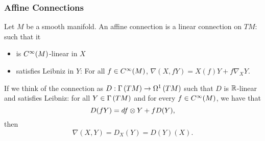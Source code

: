 \documentclass[main.tex]{subfiles}
\begin{document}
\subsubsection{Affine Connections}

Let $M$ be a smooth manifold. An affine connection is a linear connection on $TM$:
 such that it
\begin{itemize}
  \item is $C^\infty(M)$-linear in $X$
  \item satisfies Leibniz in $Y$: For all $f \in C^\infty(M)$, $\nabla(X, fY) = X(f)Y + f \nabla_X Y$.
\end{itemize}

\begin{note}
  If we think of the connection as $D: \Gamma\left( TM \right) \to \Omega^{1}\left( TM \right)$ such that $D$ is $\mathbb{R}$-linear and satisfies Leibniz: for all $Y \in \Gamma\left( TM \right)$ and for every $f \in C^\infty(M)$, we have that
  \[
    D(fY) = df \otimes Y + f D(Y),
  \] then
  \[
    \nabla(X, Y) = D_X(Y) = D(Y)(X).
  \]
\end{note}
\end{document}
